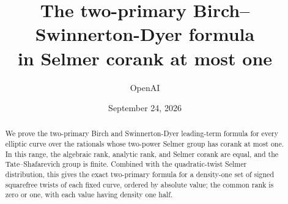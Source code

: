 \documentclass[11pt]{article}
\title{The two-primary Birch--Swinnerton-Dyer formula\\in Selmer corank at most one}
\author{OpenAI}
\date{September 24, 2026}
\numberwithin{equation}{section}
\theoremstyle{definition}
\theoremstyle{remark}
\begin{document}
\maketitle
\begin{abstract}
We prove the two-primary Birch and Swinnerton-Dyer leading-term formula for every elliptic curve over the rationals whose two-power Selmer group has corank at most one. In this range, the algebraic rank, analytic rank, and Selmer corank are equal, and the Tate--Shafarevich group is finite. Combined with the quadratic-twist Selmer distribution, this gives the exact two-primary formula for a density-one set of signed squarefree twists of each fixed curve, ordered by absolute value; the common rank is zero or one, with each value having density one half.
\end{abstract}
\tableofcontents
















\end{document}
